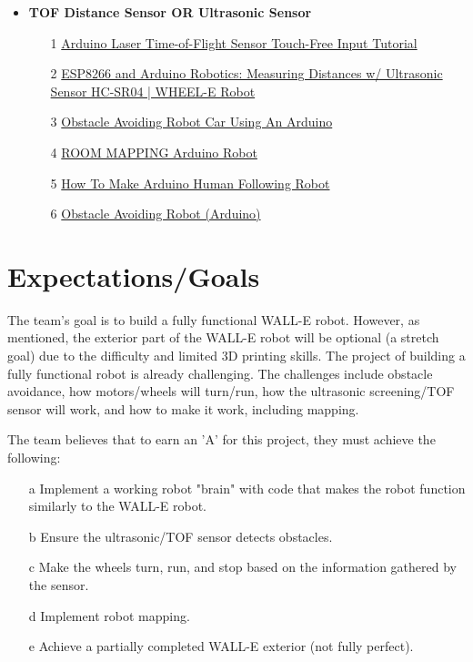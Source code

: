 \documentclass[12pt]{article}
\begin{document}
\begin{itemize}
    \item \textbf{TOF Distance Sensor OR Ultrasonic Sensor}
    \begin{itemize}
        \item[1] \href{https://www.youtube.com/watch?v=VnSfw9ynemc}{Arduino Laser Time-of-Flight Sensor Touch-Free Input Tutorial}
        \item[2] \href{https://www.youtube.com/watch?v=ii5ofdo_968}{ESP8266 and Arduino Robotics: Measuring Distances w/ Ultrasonic Sensor HC-SR04 | WHEEL-E Robot}
        \item[3] \href{https://www.youtube.com/watch?v=nUas-A0THDo}{Obstacle Avoiding Robot Car Using An Arduino} 
        \item[4] \href{https://www.youtube.com/watch?v=4X_EjUZp2c0}{ROOM MAPPING Arduino Robot}
        \item[5] \href{https://www.youtube.com/watch?v=yAV5aZ0unag}{How To Make Arduino Human Following Robot}
        \item[6] \href{https://www.instructables.com/Obstacle-Avoiding-Robot-Arduino-1/#}{Obstacle Avoiding Robot (Arduino)} 
    \end{itemize}
\end{itemize}

\section{Expectations/Goals} %

The team's goal is to build a fully functional WALL-E robot. However, as mentioned, the exterior part of the WALL-E robot will be optional (a stretch goal) due to the difficulty and limited 3D printing skills. The project of building a fully functional robot is already challenging. The challenges include obstacle avoidance, how motors/wheels will turn/run, how the ultrasonic screening/TOF sensor will work, and how to make it work, including mapping.

The team believes that to earn an 'A' for this project, they must achieve the following:

\begin{itemize}
    \item[a] Implement a working robot "brain" with code that makes the robot function similarly to the WALL-E robot.
    \item[b] Ensure the ultrasonic/TOF sensor detects obstacles.
    \item[c] Make the wheels turn, run, and stop based on the information gathered by the sensor.
    \item[d] Implement robot mapping.
    \item[e] Achieve a partially completed WALL-E exterior (not fully perfect).
\end{itemize}
\end{document}
